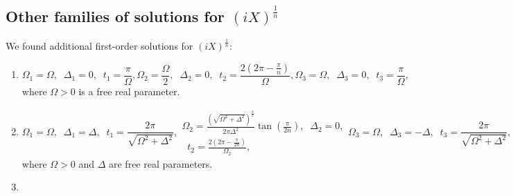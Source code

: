 \documentclass[floatfix,reprint, amsmath,amssymb,aps,superscriptaddress,nofootinbib]{revtex4-2}
\begin{document}
\subsection{Other families of solutions for \texorpdfstring{${\left(iX\right)}^{\frac{1}{n}}$}{Lg}}
We found additional first-order solutions for ${\left(iX\right)}^{\frac{1}{n}}$:
\begin{enumerate}
    \item 
\begin{subequations}
\begin{equation}
    \Omega_1=\Omega  , \;\; \Delta_1=0  , \;\; t_1=\frac{\pi}{\Omega}  , 
\end{equation}
\begin{equation}
    \Omega_2=\frac{\Omega}{2}  , \;\; \Delta_2=0  , \;\; t_2=\frac{2\left(2\pi- \frac{\pi}{n} \right)}{\Omega}  , 
\end{equation}
\begin{equation}
    \Omega_3=\Omega  , \;\; \Delta_3=0  , \;\; t_3=\frac{\pi}{\Omega}  , 
\end{equation}
\label{eq: (iX)^1/n gate in 3 segments B}
\end{subequations}
where $\Omega>0$ is a free real parameter.
\item
\begin{subequations}
\begin{equation}
    \Omega_1=\Omega  , \;\; \Delta_1=\Delta  , \;\; t_1=\frac{2\pi}{\sqrt{\Omega^2+\Delta^2}}  , 
\end{equation}
\begin{equation}
\begin{split}
    \Omega_2= \frac{\left( \sqrt{\Omega^2+\Delta^2} \right)^{\frac{3}{2}}}{2\pi \Delta^2} \tan{\left( \frac{\pi}{2n} \right)}  , \;\; \Delta_2=0  , \\ \;\; t_2=\frac{2\left(2\pi- \frac{\pi}{2n} \right)}{\Omega_2}  , 
\end{split}
\end{equation}

\begin{equation}
    \Omega_3=\Omega  , \;\; \Delta_3=-\Delta  , \;\; t_3=\frac{2\pi}{\sqrt{\Omega^2+\Delta^2}}  , 
\end{equation}
\label{eq: (iX)^1/n gate in 3 segments C}
\end{subequations}
where $\Omega>0$ and $\Delta$ are free real parameters.

\item

\begin{subequations}


\end{subequations}
\end{enumerate}
\end{document}
